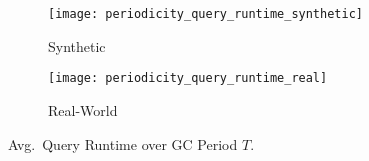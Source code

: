 \documentclass[abstracton,12pt]{scrartcl}
\theoremstyle{definition}
\begin{document}
\vspace{-0.4cm}

\begin{figure}[H]
  \centering
  \begin{subfigure}{0.49\linewidth}
    \centering
    \caption{Synthetic}
    \texttt{[image: periodicity\_query\_runtime\_synthetic]}
    \label{fig:period_runtime_synthetic}
  \end{subfigure}
  \begin{subfigure}{0.49\linewidth}
    \centering
    \caption{Real-World}
    \texttt{[image: periodicity\_query\_runtime\_real]}
    \label{fig:period_runtime_real}
  \end{subfigure}
  \vspace{-0.65cm}
  \caption[Avg.\ Query Runtime over GC Period $T$]{
  Avg.\ Query Runtime over GC Period $T$.}
\end{figure}


\end{document}
